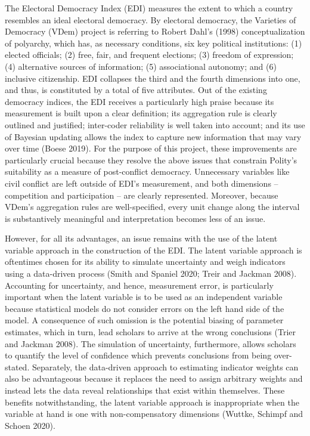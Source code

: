 \documentclass [11pt]{article}
\begin{document}
The Electoral Democracy Index (EDI) measures the extent to which a country resembles an ideal electoral democracy. By electoral democracy, the Varieties of Democracy (VDem) project is referring to Robert Dahl's (1998) conceptualization of polyarchy, which has, as necessary conditions, six key political institutions: (1) elected officials; (2) free, fair, and frequent elections; (3) freedom of expression; (4) alternative sources of information; (5) associational autonomy; and (6) inclusive citizenship. EDI collapses the third and the fourth dimensions into one, and thus, is constituted by a total of five attributes. Out of the existing democracy indices, the EDI receives a particularly high praise because its measurement is built upon a clear definition; its aggregation rule is clearly outlined and justified; inter-coder reliability is well taken into account; and its use of Bayesian updating allows the index to capture new information that may vary over time (Boese 2019). For the purpose of this project, these improvements are particularly crucial because they resolve the above issues that constrain Polity's suitability as a measure of post-conflict democracy. Unnecessary variables like civil conflict are left outside of EDI's measurement, and both dimensions -- competition and participation -- are clearly represented. Moreover, because VDem's aggregation rules are well-specified, every unit change along the interval is substantively meaningful and interpretation becomes less of an issue.

However, for all its advantages, an issue remains with the use of the latent variable approach in the construction of the EDI. The latent variable approach is oftentimes chosen for its ability to simulate uncertainty and weigh indicators using a data-driven process (Smith and Spaniel 2020; Treir and Jackman 2008). Accounting for uncertainty, and hence, measurement error, is particularly important when the latent variable is to be used as an independent variable because statistical models do not consider errors on the left hand side of the model. A consequence of such omission is the potential biasing of parameter estimates, which in turn, lead scholars to arrive at the wrong conclusions (Trier and Jackman 2008). The simulation of uncertainty, furthermore, allows scholars to quantify the level of confidence which prevents conclusions from being over-stated. Separately, the data-driven approach to estimating indicator weights can also be advantageous because it replaces the need to assign arbitrary weights and instead lets the data reveal relationships that exist within themselves. These benefits notwithstanding, the latent variable approach is inappropriate when the variable at hand is one with non-compensatory dimensions (Wuttke, Schimpf and Schoen 2020).
\end{document}
